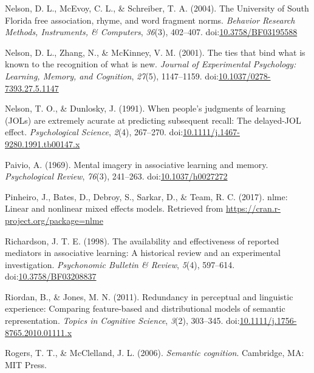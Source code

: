 \documentclass[english,,man]{apa6}
\begin{document}
\leavevmode\hypertarget{ref-Nelson2004}{}%
Nelson, D. L., McEvoy, C. L., \& Schreiber, T. A. (2004). The University of South Florida free association, rhyme, and word fragment norms. \emph{Behavior Research Methods, Instruments, \& Computers}, \emph{36}(3), 402--407. doi:\href{https://doi.org/10.3758/BF03195588}{10.3758/BF03195588}

\leavevmode\hypertarget{ref-Nelson2001}{}%
Nelson, D. L., Zhang, N., \& McKinney, V. M. (2001). The ties that bind what is known to the recognition of what is new. \emph{Journal of Experimental Psychology: Learning, Memory, and Cognition}, \emph{27}(5), 1147--1159. doi:\href{https://doi.org/10.1037/0278-7393.27.5.1147}{10.1037/0278-7393.27.5.1147}

\leavevmode\hypertarget{ref-Nelson1991}{}%
Nelson, T. O., \& Dunlosky, J. (1991). When people's judgments of learning (JOLs) are extremely acurate at predicting subsequent recall: The delayed-JOL effect. \emph{Psychological Science}, \emph{2}(4), 267--270. doi:\href{https://doi.org/10.1111/j.1467-9280.1991.tb00147.x}{10.1111/j.1467-9280.1991.tb00147.x}

\leavevmode\hypertarget{ref-Paivio1969}{}%
Paivio, A. (1969). Mental imagery in associative learning and memory. \emph{Psychological Review}, \emph{76}(3), 241--263. doi:\href{https://doi.org/10.1037/h0027272}{10.1037/h0027272}

\leavevmode\hypertarget{ref-Pinheiro2017}{}%
Pinheiro, J., Bates, D., Debroy, S., Sarkar, D., \& Team, R. C. (2017). nlme: Linear and nonlinear mixed effects models. Retrieved from \url{https://cran.r-project.org/package=nlme}

\leavevmode\hypertarget{ref-Richardson1998}{}%
Richardson, J. T. E. (1998). The availability and effectiveness of reported mediators in associative learning: A historical review and an experimental investigation. \emph{Psychonomic Bulletin \& Review}, \emph{5}(4), 597--614. doi:\href{https://doi.org/10.3758/BF03208837}{10.3758/BF03208837}

\leavevmode\hypertarget{ref-Riordan2011}{}%
Riordan, B., \& Jones, M. N. (2011). Redundancy in perceptual and linguistic experience: Comparing feature-based and distributional models of semantic representation. \emph{Topics in Cognitive Science}, \emph{3}(2), 303--345. doi:\href{https://doi.org/10.1111/j.1756-8765.2010.01111.x}{10.1111/j.1756-8765.2010.01111.x}

\leavevmode\hypertarget{ref-Rogers2006}{}%
Rogers, T. T., \& McClelland, J. L. (2006). \emph{Semantic cognition}. Cambridge, MA: MIT Press.
\end{document}
